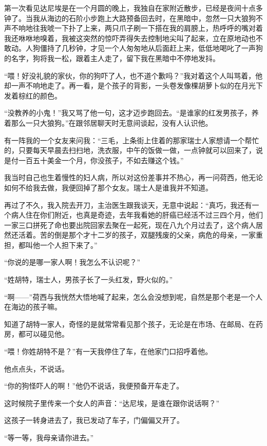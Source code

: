 \par 第一次看见达尼埃是在一个月圆的晚上，我独自在家附近散步，已经是夜间十点多钟了。当我从海边的石阶小步跑上大路预备回去时，在黑暗中，忽然一只大狼狗不声不响地往我唬一下扑了上来，两只爪子刷一下搭在我的肩膀上，热呼呼的嘴对着我还咻咻地嗅着，我被这突然的惊吓弄得失去控制地尖叫了起来，立在原地动也不敢动。人狗僵持了几秒钟，才见一个人匆匆地从后面赶上来，低低地喝叱了一声狗的名字，狗将我一松，跟着主人走了，留下我在黑暗中不停地发抖。
\par “喂！好没礼貌的家伙，你的狗吓了人，也不道个歉吗？”我对着这个人叫骂着，他却一声不响地走了。再一看，是个孩子的背影，一头卷发像棵胡萝卜似的在月光下发着棕红的颜色。
\par “没教养的小鬼！”我又骂了他一句，这才迈步跑回去。“是谁家的红发男孩子，养着那么一只大狼狗。”在跟邻居聊天时无意间谈起，没有人认识他。
\par 有一阵我的一个女友来问我：“三毛，上条街上住着的那家瑞士人家想请一个帮忙的，只要每天早晨去扫扫地，洗衣服，中午的饭做一做，一点钟就可以回来了，说是付一百五十美金一个月，你没孩子，不如去赚这个钱。”
\par 我当时自己也生着慢性的妇人病，所以对这份差事并不热心，再一问荷西，他无论如何不给我去做，我便回掉了那个女友。瑞士人是谁我并不知道。
\par 再过了不久，我入院去开刀，主治医生跟我谈天，无意中说起：“真巧，我还有一个病人住在你们附近，也真是奇迹，去年我看她的肝癌已经活不过三四个月，他们一家三口拼死了命也要出院回家去聚在一起死，现在八九个月过去了，这个病人居然还活着。苦的倒是那个才十二岁的孩子，双腿残废的父亲，病危的母亲，一家重担，都叫他一个人担下来了。”
\par “你说的是哪一家人啊！我怎么不认识呢？”
\par “姓胡特，瑞士人，男孩子长了一头红发，野火似的。”
\par “啊——”荷西与我恍然大悟地喊了起来，怎么会没想到呢，自然是那个老是一个人在海边的孩子嘛。
\par 知道了胡特一家人，奇怪的是就常常看见那个孩子，无论是在市场、在邮局、在药房，都可以碰见他。
\par “喂！你姓胡特不是？”有一天我停住了车，在他家门口招呼着他。
\par 他点点头，不说话。
\par “你的狗怪吓人的啊！”他仍不说话，我便预备开车走了。
\par 这时候院子里传来一个女人的声音：“达尼埃，是谁在跟你说话啊？”
\par 这孩子一转身进去了，我已发动了车子，门偏偏又开了。
\par “等一等，我母亲请你进去。”
